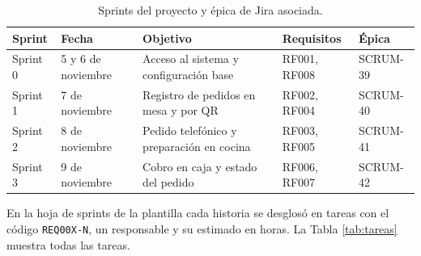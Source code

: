 \documentclass[a4paper, 11pt]{article}
\begin{document}
{\small
\begin{longtable}{|p{1.6cm}|p{2.6cm}|p{4.3cm}|p{2.6cm}|p{2cm}|}
\caption{Sprints del proyecto y épica de Jira asociada.}\label{tab:sprints}\\
\hline
\textbf{Sprint} & \textbf{Fecha} & \textbf{Objetivo} & \textbf{Requisitos} & \textbf{Épica} \\ \hline
\endfirsthead
Sprint 0 & 5 y 6 de noviembre & Acceso al sistema y configuración base & RF001, RF008 & SCRUM-39 \\ \hline
Sprint 1 & 7 de noviembre & Registro de pedidos en mesa y por QR & RF002, RF004 & SCRUM-40 \\ \hline
Sprint 2 & 8 de noviembre & Pedido telefónico y preparación en cocina & RF003, RF005 & SCRUM-41 \\ \hline
Sprint 3 & 9 de noviembre & Cobro en caja y estado del pedido & RF006, RF007 & SCRUM-42 \\ \hline
\end{longtable}
}

En la hoja de sprints de la plantilla cada historia se desglosó en tareas con el código \texttt{REQ00X-N}, un responsable y su estimado en horas. La Tabla \ref{tab:tareas} muestra todas las tareas.
\end{document}
